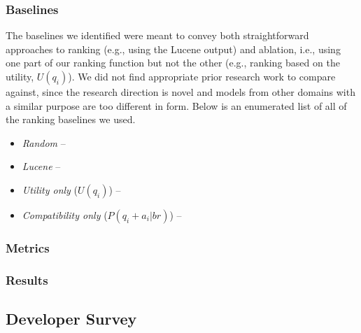 \subsubsection{Baselines}
The baselines we identified were meant to convey both straightforward approaches to ranking (e.g., using the Lucene output) and
ablation, i.e., using one part of our ranking function but not the other (e.g., ranking based on the utility, $U(q_{i})$). We did not
find appropriate prior research work to compare against, since the research direction is novel and models from other domains with a similar
purpose are too different in form. Below is an enumerated list of all of the ranking baselines we used.
\begin{itemize}
\item {\em Random} --
\item {\em Lucene} --
\item {\em Utility only} ($U(q_{i})$) --
\item {\em Compatibility only} ($P(q_{i}+a_{i}|br)$) --
\end{itemize}

\subsubsection{Metrics}


\subsubsection{Results}


\subsection{Developer Survey}
